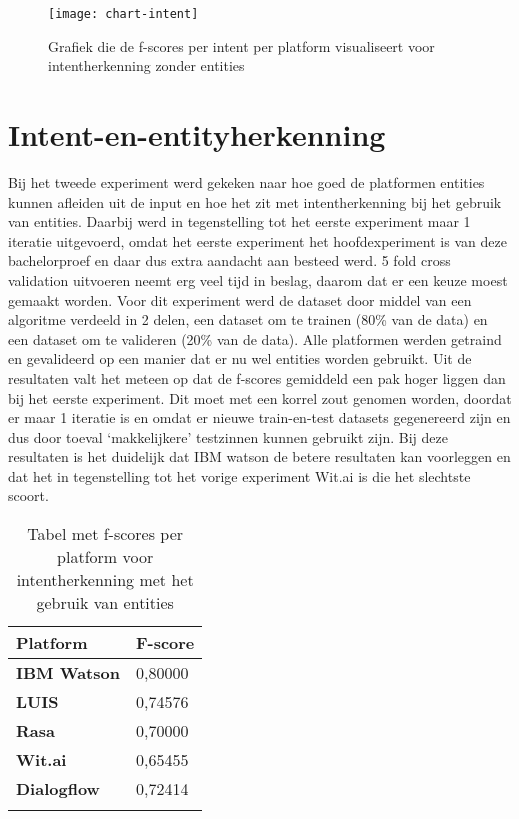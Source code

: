 \begin{figure}[H]
    \label{fig:chart-intent-no-entity}
    \centering
    \texttt{[image: chart-intent]}
    \caption{Grafiek die de f-scores per intent per platform visualiseert voor intentherkenning zonder entities}
\end{figure}

\section{Intent-en-entityherkenning}

Bij het tweede experiment werd gekeken naar hoe goed de platformen entities kunnen afleiden uit de input en hoe het zit met intentherkenning bij het gebruik van entities. Daarbij werd in tegenstelling tot het eerste experiment maar 1 iteratie uitgevoerd, omdat het eerste experiment het hoofdexperiment is van deze bachelorproef en daar dus extra aandacht aan besteed werd. 5 fold cross validation uitvoeren neemt erg veel tijd in beslag, daarom dat er een keuze moest gemaakt worden. Voor dit experiment werd de dataset door middel van een algoritme verdeeld in 2 delen, een dataset om te trainen (80\% van de data) en een dataset om te valideren (20\% van de data). Alle platformen werden getraind en gevalideerd op een manier dat er nu wel entities worden gebruikt. Uit de resultaten valt het meteen op dat de f-scores gemiddeld een pak hoger liggen dan bij het eerste experiment. Dit moet met een korrel zout genomen worden, doordat er maar 1 iteratie is en omdat er nieuwe train-en-test datasets gegenereerd zijn en dus door toeval ‘makkelijkere’ testzinnen kunnen gebruikt zijn. Bij deze resultaten is het duidelijk dat IBM watson de betere resultaten kan voorleggen en dat het in tegenstelling tot het vorige experiment Wit.ai is die het slechtste scoort.


\begin{center}
    \begin{longtable}{| l | l |}
        \hline
        \textbf{Platform} & \textbf{F-score} \\ \hline
        \textbf{IBM Watson} & 0,80000 \\ \hline  
        \textbf{LUIS} & 0,74576 \\ \hline  
        \textbf{Rasa} & 0,70000 \\ \hline  
        \textbf{Wit.ai} & 0,65455  \\ \hline  
        \textbf{Dialogflow} & 0,72414 \\ \hline  
        \caption{Tabel met f-scores per platform voor intentherkenning met het gebruik van entities}                                    
    \end{longtable}
    \label{tbl:results-intent-entity}
\end{center}

